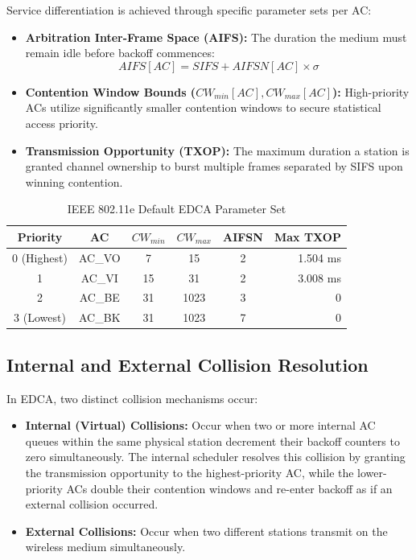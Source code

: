 Service differentiation is achieved through specific parameter sets per AC:
\begin{itemize}
    \item \textbf{Arbitration Inter-Frame Space (AIFS):} The duration the medium must remain idle before backoff commences:
    \begin{equation}
        AIFS[AC] = SIFS + AIFSN[AC] \times \sigma
    \end{equation}
    \item \textbf{Contention Window Bounds ($CW_{min}[AC], CW_{max}[AC]$):} High-priority ACs utilize significantly smaller contention windows to secure statistical access priority.
    \item \textbf{Transmission Opportunity (TXOP):} The maximum duration a station is granted channel ownership to burst multiple frames separated by SIFS upon winning contention.
\end{itemize}

\begin{table}[htbp]
\centering
\caption{IEEE 802.11e Default EDCA Parameter Set}
\label{tab:edca_params}
\begin{tabular}{|c|c|c|c|c|r|}
\hline
\textbf{Priority} & \textbf{AC} & \textbf{$CW_{min}$} & \textbf{$CW_{max}$} & \textbf{AIFSN} & \textbf{Max TXOP} \\
\hline
0 (Highest) & AC\_VO & 7  & 15 & 2 & 1.504 ms \\
\hline
1 & AC\_VI & 15 & 31 & 2 & 3.008 ms \\
\hline
2 & AC\_BE & 31 & 1023 & 3 & 0 \\
\hline
3 (Lowest) & AC\_BK & 31 & 1023 & 7 & 0 \\
\hline
\end{tabular}
\end{table}

\subsection{Internal and External Collision Resolution}
In EDCA, two distinct collision mechanisms occur:
\begin{itemize}
    \item \textbf{Internal (Virtual) Collisions:} Occur when two or more internal AC queues within the same physical station decrement their backoff counters to zero simultaneously. The internal scheduler resolves this collision by granting the transmission opportunity to the highest-priority AC, while the lower-priority ACs double their contention windows and re-enter backoff as if an external collision occurred.
    \item \textbf{External Collisions:} Occur when two different stations transmit on the wireless medium simultaneously.
\end{itemize}

